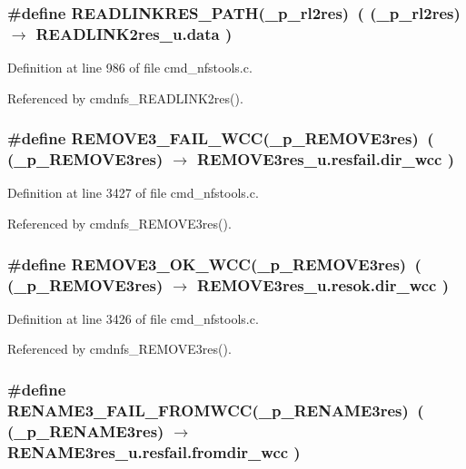 \subsubsection{\setlength{\rightskip}{0pt plus 5cm}\#define READLINKRES\_\-PATH(\_\-p\_\-rl2res)\ ( (\_\-p\_\-rl2res) $\rightarrow$ READLINK2res\_\-u.data )}\label{cmd__nfstools_8c_a7}




Definition at line 986 of file cmd\_\-nfstools.c.

Referenced by cmdnfs\_\-READLINK2res().
\subsubsection{\setlength{\rightskip}{0pt plus 5cm}\#define REMOVE3\_\-FAIL\_\-WCC(\_\-p\_\-REMOVE3res)\ ( (\_\-p\_\-REMOVE3res) $\rightarrow$ REMOVE3res\_\-u.resfail.dir\_\-wcc )}\label{cmd__nfstools_8c_a34}




Definition at line 3427 of file cmd\_\-nfstools.c.

Referenced by cmdnfs\_\-REMOVE3res().
\subsubsection{\setlength{\rightskip}{0pt plus 5cm}\#define REMOVE3\_\-OK\_\-WCC(\_\-p\_\-REMOVE3res)\ ( (\_\-p\_\-REMOVE3res) $\rightarrow$ REMOVE3res\_\-u.resok.dir\_\-wcc )}\label{cmd__nfstools_8c_a33}




Definition at line 3426 of file cmd\_\-nfstools.c.

Referenced by cmdnfs\_\-REMOVE3res().
\subsubsection{\setlength{\rightskip}{0pt plus 5cm}\#define RENAME3\_\-FAIL\_\-FROMWCC(\_\-p\_\-RENAME3res)\ ( (\_\-p\_\-RENAME3res) $\rightarrow$ RENAME3res\_\-u.resfail.fromdir\_\-wcc )}\label{cmd__nfstools_8c_a41}




